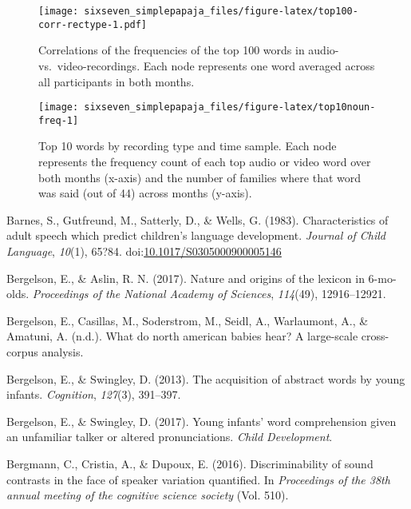 \documentclass[man]{apa6}
\theoremstyle{definition}
\theoremstyle{definition}
\theoremstyle{definition}
\theoremstyle{remark}
\begin{document}
\begin{figure}
\centering
\texttt{[image: sixseven\_simplepapaja\_files/figure-latex/top100-corr-rectype-1.pdf]}
\caption{\label{fig:top100-corr-rectype}Correlations of the frequencies of
the top 100 words in audio- vs.~video-recordings. Each node represents
one word averaged across all participants in both months.}
\end{figure}

\begin{figure}
\texttt{[image: sixseven\_simplepapaja\_files/figure-latex/top10noun-freq-1]} \caption{Top 10 words by recording type and time sample. Each node represents the frequency count of each top audio or video word over both months (x-axis) and the number of families where that word was said (out of 44) across months (y-axis).}\label{fig:top10noun-freq}
\end{figure}

\setlength{\parindent}{-0.5in}
\setlength{\leftskip}{0.5in}

\hypertarget{refs}{}
\leavevmode\hypertarget{ref-barnes1983characteristics}{}%
Barnes, S., Gutfreund, M., Satterly, D., \& Wells, G. (1983).
Characteristics of adult speech which predict children's language
development. \emph{Journal of Child Language}, \emph{10}(1), 65?84.
doi:\href{https://doi.org/10.1017/S0305000900005146}{10.1017/S0305000900005146}

\leavevmode\hypertarget{ref-bergelson2017nature}{}%
Bergelson, E., \& Aslin, R. N. (2017). Nature and origins of the lexicon
in 6-mo-olds. \emph{Proceedings of the National Academy of Sciences},
\emph{114}(49), 12916--12921.

\leavevmode\hypertarget{ref-bergelsonunderreview}{}%
Bergelson, E., Casillas, M., Soderstrom, M., Seidl, A., Warlaumont, A.,
\& Amatuni, A. (n.d.). What do north american babies hear? A large-scale
cross-corpus analysis.

\leavevmode\hypertarget{ref-bergelson2013acquisition}{}%
Bergelson, E., \& Swingley, D. (2013). The acquisition of abstract words
by young infants. \emph{Cognition}, \emph{127}(3), 391--397.

\leavevmode\hypertarget{ref-bergelson2017young}{}%
Bergelson, E., \& Swingley, D. (2017). Young infants' word comprehension
given an unfamiliar talker or altered pronunciations. \emph{Child
Development}.

\leavevmode\hypertarget{ref-bergmann2016discriminability}{}%
Bergmann, C., Cristia, A., \& Dupoux, E. (2016). Discriminability of
sound contrasts in the face of speaker variation quantified. In
\emph{Proceedings of the 38th annual meeting of the cognitive science
society} (Vol. 510).
\end{document}
